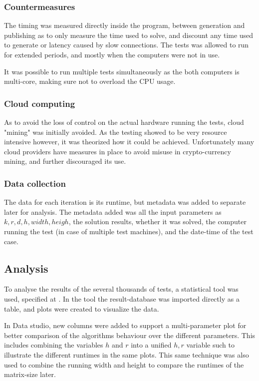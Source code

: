 \documentclass[a4paper]{article}
\begin{document}
\subsubsection{Countermeasures}
The timing was measured directly inside the program, between generation and publishing as to only measure
the time used to solve, and discount any time used to generate or latency caused by slow connections. The tests
was allowed to run for extended periods, and mostly when the computers were not in use.

It was possible to run multiple tests simultaneously as the both computers is multi-core, making sure not to overload
the CPU usage.

\subsubsection{Cloud computing}
As to avoid the loss of control on the actual hardware running the tests, cloud "mining" was initially
avoided. As the testing showed to be very resource intensive however, it was theorized how it could be achieved.
Unfortunately many cloud providers have measures in place to avoid misuse in crypto-currency mining, and further
discouraged its use.

\subsubsection{Data collection}
The data for each iteration is its runtime, but metadata was added to separate later for analysis. The
metadata added was all the input parameters as $k,r,d,h, width, heigh$, the solution results, whether it was solved, the
computer running the test (in case of multiple test machines), and the date-time of the test case.

\subsection{Analysis}
To analyse the results of the several thousands of tests, a statistical tool was used, specified at
. In the tool the result-database was imported directly as a table, and plots were
created to visualize the data.

In Data studio, new columns were added to support a multi-parameter plot for better comparison of the
algorithms behaviour over the different parameters. This includes combining the variables $h$ and $r$ into
a unified $h, r$ variable such to illustrate the different runtimes in the same plots. This same technique was
also used to combine the running width and height to compare the runtimes of the matrix-size later.
\end{document}
